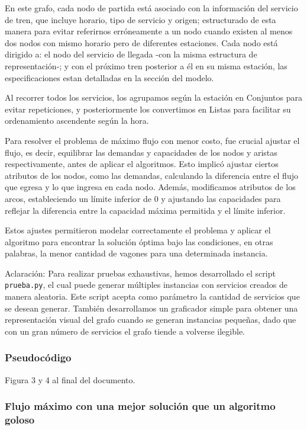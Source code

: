 \documentclass{article}
\begin{document}
    En este grafo, cada nodo de partida está asociado con la información del servicio de tren, que incluye horario, tipo de servicio y origen; estructurado de esta manera para evitar referirnos erróneamente a un nodo cuando existen al menos dos nodos con mismo horario pero de diferentes estaciones. Cada nodo está dirigido a: el nodo del servicio de llegada -con la misma estructura de representación-; y con el próximo tren posterior a él en su misma estación, las especificaciones estan detalladas en la sección del modelo.
    
   Al recorrer todos los servicios, los agrupamos según la estación en Conjuntos para evitar repeticiones, y posteriormente los convertimos en Listas para facilitar su ordenamiento ascendente según la hora.
    
    Para resolver el problema de  máximo flujo con menor costo, fue crucial  ajustar el flujo, es decir, equilibrar las demandas y capacidades de los nodos y aristas respectivamente, antes de aplicar el algoritmos. Esto implicó ajustar ciertos atributos de los nodos, como las demandas, calculando la diferencia entre el flujo que egresa y lo que ingresa en cada nodo. Además, modificamos atributos de los arcos, estableciendo un límite inferior de 0 y ajustando las capacidades para reflejar la diferencia entre la capacidad máxima permitida y el límite inferior.
    
    Estos ajustes permitieron modelar correctamente el problema y aplicar el algoritmo para encontrar la solución óptima bajo las condiciones, en otras palabras, la menor cantidad de vagones para una determinada instancia.

     Aclaración: Para realizar pruebas exhaustivas, hemos desarrollado el script \texttt{prueba.py}, el cual puede generar múltiples instancias con servicios creados de manera aleatoria. Este script acepta como parámetro la cantidad de servicios que se desean generar.
     También desarrollamos un graficador simple para obtener una representación visual del grafo cuando se generan instancias pequeñas, dado que con un gran número de servicios el grafo tiende a volverse ilegible.


    \subsubsection{Pseudocódigo}
    Figura 3 y 4 al final del documento.
    \subsubsection{Flujo máximo con una mejor solución que un algoritmo goloso}
       
\end{document}
